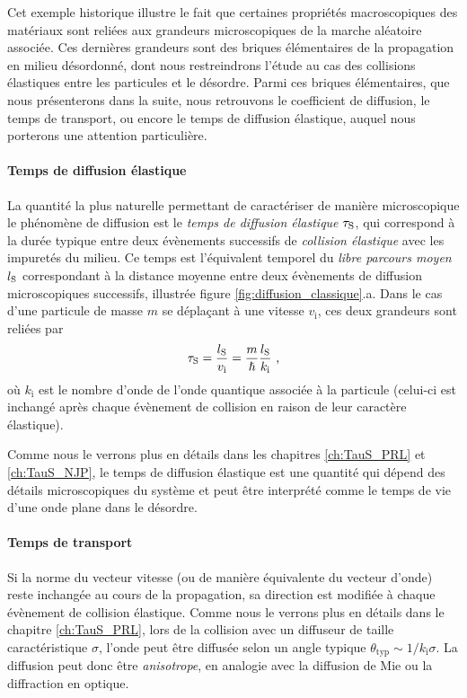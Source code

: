 Cet exemple historique illustre le fait que certaines propriétés macroscopiques des matériaux sont reliées aux grandeurs microscopiques de la marche aléatoire associée. Ces dernières grandeurs sont des briques élémentaires de la propagation en milieu désordonné, dont nous restreindrons l'étude au cas des collisions élastiques entre les particules et le désordre. Parmi ces briques élémentaires, que nous présenterons dans la suite, nous retrouvons le coefficient de diffusion, le temps de transport, ou encore le temps de diffusion élastique, auquel nous porterons une attention particulière.

\paragraph*{Temps de diffusion élastique}
La quantité la plus naturelle permettant de caractériser de manière microscopique le phénomène de diffusion est le \emph{temps de diffusion élastique} $\tau_{\mathrm{S}}$, qui correspond à la durée typique entre deux évènements successifs de \emph{collision élastique} avec les impuretés du milieu. Ce temps est l'équivalent temporel du \emph{libre parcours moyen}  $l_{\mathrm{S}}$ correspondant à la distance moyenne entre deux évènements de diffusion microscopiques successifs, illustrée figure \ref{fig:diffusion_classique}.a. Dans le cas d'une particule de masse $m$ se déplaçant à une vitesse $v_{\mathrm{i}}$, ces deux grandeurs sont reliées par
\begin{equation}
\tau_{\mathrm{S}}=\frac{l_{\mathrm{S}}}{v_{\mathrm{i}}}=\frac{m}{\hslash} \frac{l_{\mathrm{S}}}{k_{\mathrm{i}}} \text{ ,}
\label{eq:definition_taus}
\end{equation}
où $k_{\mathrm{i}}$ est le nombre d'onde de l'onde quantique associée à la particule (celui-ci est inchangé après chaque évènement de collision en raison de leur caractère élastique). 

Comme nous le verrons plus en détails dans les chapitres \ref{ch:TauS_PRL} et \ref{ch:TauS_NJP}, le temps de diffusion élastique est une quantité qui dépend des détails microscopiques du système et peut être interprété comme le temps de vie d'une onde plane dans le désordre.

\paragraph*{Temps de transport}
Si la norme du vecteur vitesse (ou de manière équivalente du vecteur d'onde) reste inchangée au cours de la propagation, sa direction est modifiée à chaque évènement de collision élastique. Comme nous le verrons plus en détails dans le chapitre \ref{ch:TauS_PRL}, lors de la collision avec un diffuseur de taille caractéristique $\sigma$, l'onde peut être diffusée selon un angle typique $\theta_{\mathrm{typ}}\sim 1/k_{\mathrm{i}} \sigma$. La diffusion peut donc être \emph{anisotrope}, en analogie avec la diffusion de Mie ou la diffraction en optique.

